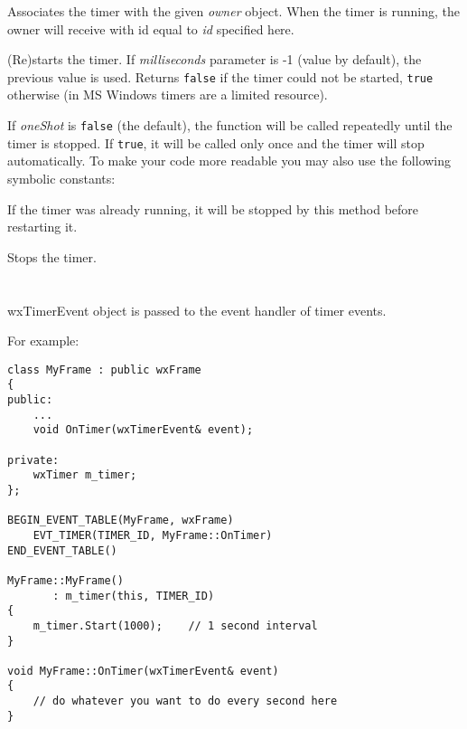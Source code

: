 
Associates the timer with the given {\it owner}\/ object. When the timer is
running, the owner will receive  with
id equal to {\it id}\/ specified here.

\label{wxtimerstart}


(Re)starts the timer. If {\it milliseconds}\/ parameter is -1 (value by default),
the previous value is used. Returns {\tt false} if the timer could not be started,
{\tt true} otherwise (in MS Windows timers are a limited resource).

If {\it oneShot}\/ is {\tt false} (the default), the  
function will be called repeatedly until the timer is stopped. If {\tt true},
it will be called only once and the timer will stop automatically. To make your
code more readable you may also use the following symbolic constants:

\twocolwidtha{5cm}
\begin{twocollist}\itemsep=0pt
\end{twocollist}

If the timer was already running, it will be stopped by this method before
restarting it.

\label{wxtimerstop}


Stops the timer.







\section{}\label{wxtimerevent}

wxTimerEvent object is passed to the event handler of timer events.

For example:

\begin{verbatim}
class MyFrame : public wxFrame
{
public:
    ...
    void OnTimer(wxTimerEvent& event);

private:
    wxTimer m_timer;
};

BEGIN_EVENT_TABLE(MyFrame, wxFrame)
    EVT_TIMER(TIMER_ID, MyFrame::OnTimer)
END_EVENT_TABLE()

MyFrame::MyFrame()
       : m_timer(this, TIMER_ID)
{
    m_timer.Start(1000);    // 1 second interval
}

void MyFrame::OnTimer(wxTimerEvent& event)
{
    // do whatever you want to do every second here
}

\end{verbatim}

